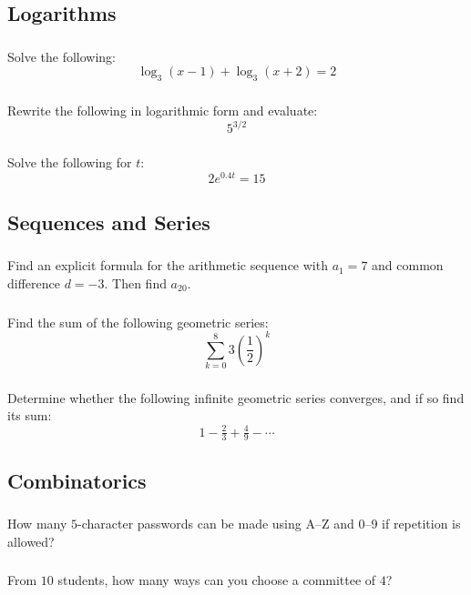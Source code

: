 \documentclass[12pt]{article}
\begin{document}
		\subsection{Logarithms}
			\subsubsection{}
				Solve the following:
				\[\log_3\left(x-1\right)+\log_3\left(x+2\right)=2\]
			\subsubsection{}
				Rewrite the following in logarithmic form and evaluate:
				\[5^{3/2}\]
			\subsubsection{}
				Solve the following for \(t\):
				\[2e^{0.4t}=15\]

		\subsection{Sequences and Series}
			\subsubsection{}
				Find an explicit formula for the arithmetic sequence with \(a_1=7\) and common difference \(d=-3\). Then find \(a_{20}\).
			\subsubsection{}
				Find the sum of the following geometric series:
				\[\sum_{k=0}^{8}3\left(\frac{1}{2}\right)^k\]
			\subsubsection{}
				Determine whether the following infinite geometric series converges, and if so find its sum:
				\[1-\tfrac{2}{3}+\tfrac{4}{9}-\cdots\]

		\subsection{Combinatorics}
			\subsubsection{}
				How many \(5\)-character passwords can be made using A--Z and 0--9 if repetition is allowed?
			\subsubsection{}
				From \(10\) students, how many ways can you choose a committee of \(4\)?
\end{document}
